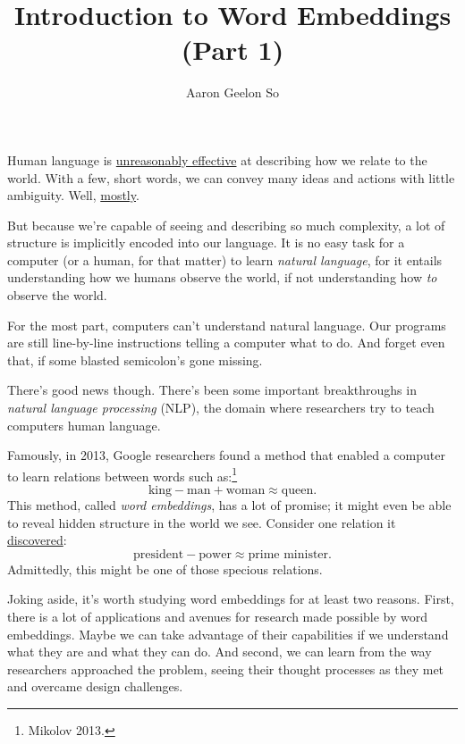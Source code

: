\documentclass[11pt]{article}
\title{Introduction to Word Embeddings (Part 1)}
\author{Aaron Geelon So}
\date{}
\begin{document}
\maketitle

Human language is
\href{https://en.wikipedia.org/wiki/The_Unreasonable_Effectiveness_of_Mathematics_in_the_Natural_Sciences}{unreasonably
effective} at describing how we relate to the world. With a few, short
words, we can convey many ideas and actions with little ambiguity. Well,
\href{http://mentalfloss.com/article/24445/10-amelia-bedelia-isms}{mostly}.

But because we're capable of seeing and describing so much complexity, a
lot of structure is implicitly encoded into our language. It is no easy
task for a computer (or a human, for that matter) to learn \emph{natural
language}, for it entails understanding how we humans observe the world,
if not understanding how \emph{to} observe the world.

For the most part, computers can't understand natural language. Our
programs are still line-by-line instructions telling a computer what to
do. And forget even that, if some blasted semicolon's gone missing.

There's good news though. There's been some important breakthroughs in
\emph{natural language processing} (NLP), the domain where researchers
try to teach computers human language.

Famously, in 2013, Google researchers found a method that enabled a
computer to learn relations between words such as:\footnote{Mikolov
  2013.}
\[\textrm{king} - \textrm{man} + \textrm{woman} \approx \textrm{queen}.\]
This method, called \emph{word embeddings}, has a lot of promise; it
might even be able to reveal hidden structure in the world we see.
Consider one relation it
\href{http://byterot.blogspot.in/2015/06/five-crazy-abstractions-my-deep-learning-word2doc-model-just-did-NLP-gensim.html}{discovered}:
\[\textrm{president} - \textrm{power} \approx \textrm{prime minister}.\]
Admittedly, this might be one of those specious relations.

Joking aside, it's worth studying word embeddings for at least two
reasons. First, there is a lot of applications and avenues for research
made possible by word embeddings. Maybe we can take advantage of their
capabilities if we understand what they are and what they can do. And
second, we can learn from the way researchers approached the problem,
seeing their thought processes as they met and overcame design
challenges.
\end{document}
